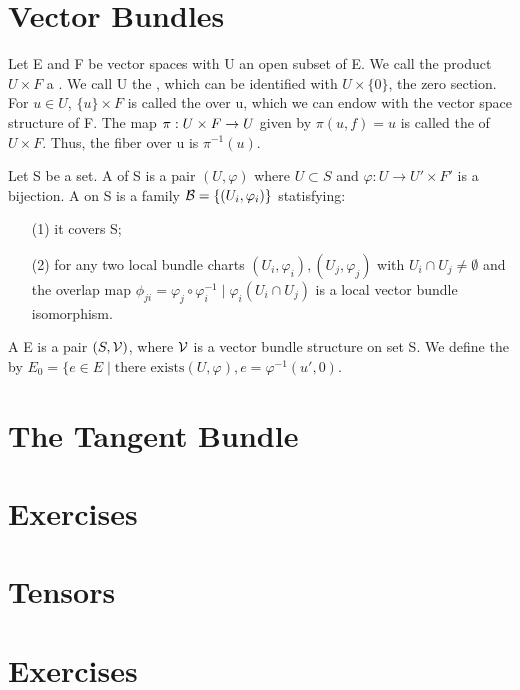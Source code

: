 \section{Vector Bundles}
\begin{definition}
Let E and F be vector spaces with U an open subset of E. We call the product $U\times F$ a . We call U
the , which can be identified with $U\times\{0\}$, the zero section. For $u\in U$, $\{u\}\times F$ is called the
 over u, which we can endow with the vector space structure of F. The map ${\pi}:{U\times F}\rightarrow{U}$ given by $\pi(
u,f)=u$ is called the  of $U\times F$. Thus, the fiber over u is $\pi^{-1}(u)$.
\end{definition}
\begin{definition}
Let S be a set. A  of S is a pair $(U,\varphi)$ where $U\subset S$ and $\varphi:U\rightarrow U'\times F'$
is a bijection. A  on S is a family $\mathcal{B}=\lbrace(U_i,\varphi_i)\rbrace$ statisfying:
\begin{enumerate}
\item[(1)] it covers S;
\item[(2)] for any two local bundle charts $(U_i,\varphi_i),(U_j,\varphi_j)$ with $U_i\cap U_j\neq\emptyset$ and the overlap map
$\phi_{ji}=\varphi_j\circ\varphi_i^{-1}\mid\varphi_i(U_i\cap U_j)$ is a local vector bundle isomorphism.
\end{enumerate}
\end{definition}
A  E is a pair $(S,\mathcal{V})$, where $\mathcal{V}$ is a vector bundle structure on set S. We define the  by $E_0=\lbrace e\in E\mid \text{there exists} (U,\varphi), e=\varphi^{-1}(u',0)$.
\section{The Tangent Bundle}
\section*{Exercises}
\section{Tensors}
\section*{Exercises}